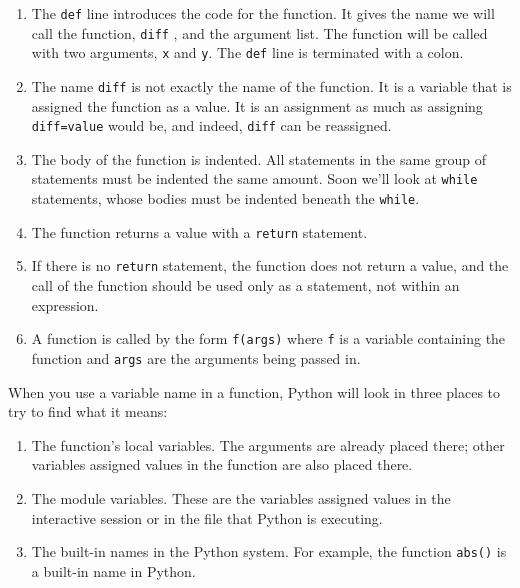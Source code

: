 \begin{enumerate}

\item
  The \texttt{def} line introduces
  the code for the function. It gives the name we will call the
  function, \texttt{diff} , and the argument list. The function will be
  called with two arguments, \texttt{x} and \texttt{y}. The \texttt{def} line
  is terminated with a colon.
\item
  The name \texttt{diff} is not
  exactly the name of the function. It is a variable that is assigned
  the function as a value. It is an assignment as much as assigning
  \texttt{diff=value} would be, and indeed, \texttt{diff} can be reassigned.
\item
  The body of the function is
  indented. All statements in the same group of statements must be
  indented the same amount. Soon we'll look at \texttt{while} statements,
  whose bodies must be indented beneath the \texttt{while}.
\item
  The function returns a value with a \texttt{return} statement.
\item
  If there is no \texttt{return} statement, the function does not return a value, and the call of the
  function should be used only as a statement, not within an expression.
\item
  A function is called by the form
  \texttt{f(args)} where \texttt{f} is a variable containing the function
  and \texttt{args} are the arguments being passed in.
\end{enumerate}

When you use a variable name in a
function, Python will look in three places to try to find what it means:

\begin{enumerate}

\item
  The function's local variables.
  The arguments are already placed there; other variables assigned
  values in the function are also placed there.
\item
  The module variables. These are
  the variables assigned values in the interactive session or in the
  file that Python is executing.
\item
  The built-in names in the Python
  system. For example, the function \texttt{abs()} is a built-in name in
  Python.
\end{enumerate}

